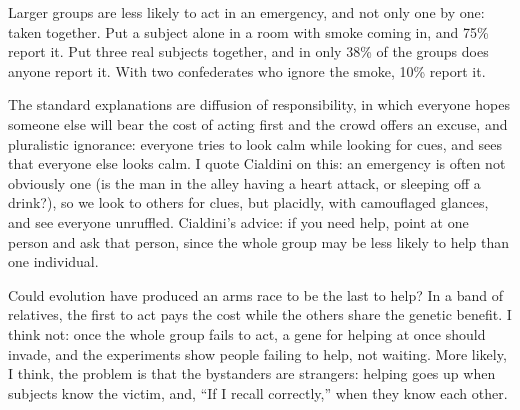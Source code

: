 
Larger groups are less likely to act in an emergency, and not only one by one: taken together. Put a subject alone in a room with smoke coming in, and 75\% report it. Put three real subjects together, and in only 38\% of the groups does anyone report it. With two confederates who ignore the smoke, 10\% report it.  

The standard explanations are diffusion of responsibility, in which everyone hopes someone else will bear the cost of acting first and the crowd offers an excuse, and pluralistic ignorance: everyone tries to look calm while looking for cues, and sees that everyone else looks calm. I quote Cialdini on this: an emergency is often not obviously one (is the man in the alley having a heart attack, or sleeping off a drink?), so we look to others for clues, but placidly, with camouflaged glances, and see everyone unruffled. Cialdini's advice: if you need help, point at one person and ask that person, since the whole group may be less likely to help than one individual.

Could evolution have produced an arms race to be the last to help? In a band of relatives, the first to act pays the cost while the others share the genetic benefit. I think not: once the whole group fails to act, a gene for helping at once should invade, and the experiments show people failing to help, not waiting.  More likely, I think, the problem is that the bystanders are strangers: helping goes up when subjects know the victim, and, ``If I recall correctly,'' when they know each other. 

